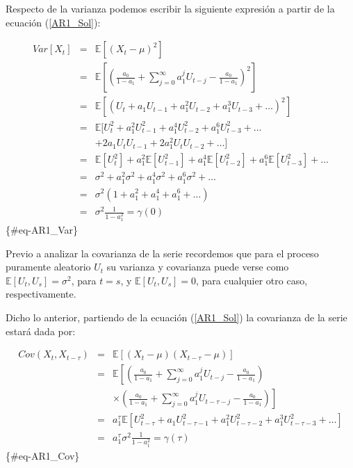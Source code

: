 \documentclass[
  a4paper,
]{article}
\begin{document}
Respecto de la varianza podemos escribir la siguiente expresión a partir
de la ecuación (\ref{AR1_Sol}):

\begin{eqnarray}
Var[X_t] & = & \mathbb{E}[(X_t - \mu)^2] \nonumber \\
    & = & \mathbb{E} \left[ \left( \frac{a_0}{1 - a_1} + \sum^{\infty}_{j = 0} a_1^j U_{t-j} - \frac{a_0}{1 - a_1} \right)^2 \right] \nonumber \\
    & = & \mathbb{E}[(U_{t} + a_1 U_{t-1} + a_1^2 U_{t-2} + a_1^3 U_{t-3} + \ldots)^2] \nonumber \\
    & = & \mathbb{E}[U^2_{t} + a_1^2 U^2_{t-1} + a_1^4 U^2_{t-2} + a_1^6 U^2_{t-3} + \ldots \nonumber \\
    &   & + 2 a_1 U_t U_{t-1} + 2 a_1^2 U_t U_{t-2} + \ldots] \nonumber \\
    & = & \mathbb{E}[U^2_{t}] + a_1^2 \mathbb{E}[U^2_{t-1}] + a_1^4 \mathbb{E}[U^2_{t-2}] + a_1^6 \mathbb{E}[U^2_{t-3}] + \ldots \nonumber \\
    & = & \sigma^2 + a_1^2 \sigma^2 + a_1^4 \sigma^2 + a_1^6 \sigma^2 + \ldots \nonumber \\
    & = & \sigma^2 (1 + a_1^2 + a_1^4 + a_1^6 + \ldots) \nonumber \\
    & = & \sigma^2 \frac{1}{1 - a_1^2} = \gamma(0)
\end{eqnarray} \{\#eq-AR1\_Var\}

Previo a analizar la covarianza de la serie recordemos que para el
proceso puramente aleatorio \(U_t\) su varianza y covarianza puede verse
como \(\mathbb{E}[U_t, U_s] = \sigma^2\), para \(t = s\), y
\(\mathbb{E}[U_t, U_s] = 0\), para cualquier otro caso, respectivamente.

Dicho lo anterior, partiendo de la ecuación (\ref{AR1_Sol}) la
covarianza de la serie estará dada por:

\begin{eqnarray}
Cov(X_t, X_{t-\tau}) & = & \mathbb{E}[(X_t - \mu)(X_{t-\tau} - \mu)] \nonumber \\
    & = & \mathbb{E} \left[ \left( \frac{a_0}{1 - a_1} + \sum^{\infty}_{j = 0} a_1^j U_{t-j} - \frac{a_0}{1 - a_1} \right) \right. \nonumber \\
    &   & \left. \times \left( \frac{a_0}{1 - a_1} + \sum^{\infty}_{j = 0} a_1^j U_{t-\tau-j} - \frac{a_0}{1 - a_1} \right) \right] \nonumber \\
    & = & a_1^{\tau} \mathbb{E}[U^2_{t-\tau} + a_1 U^2_{t-\tau-1} + a_1^2 U^2_{t-\tau-2} + a_1^3 U^2_{t-\tau-3} + \ldots] \nonumber \\
    & = & a_1^{\tau} \sigma^2 \frac{1}{1 - a_1^2} = \gamma(\tau)
\end{eqnarray} \{\#eq-AR1\_Cov\}
\end{document}
